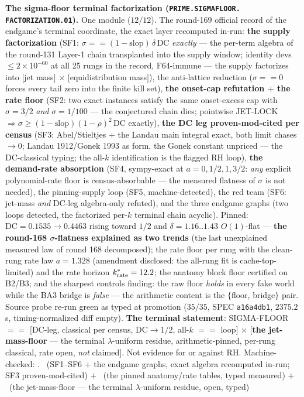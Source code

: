 \par\smallskip\noindent\textbf{The sigma-floor terminal
factorization (\texttt{PRIME.\allowbreak SIGMAFLOOR.\allowbreak
FACTORIZATION.01}).}
One module ($12/12$).  The round-169 official record of the
endgame's terminal coordinate, the exact layer recomputed
in-run: \textbf{the supply factorization} (SF1: $\sigma == (1 -
\mathrm{slop})\,\delta\,\mathrm{DC}$ \emph{exactly} --- the
per-term algebra of the round-131 Layer-1 chain transplanted
into the supply window; identity devs $\le 2\times10^{-60}$ at
all 25 rungs in the record, F64-immune --- the supply
factorizes into $[$jet mass$]$ $\times$ $[$equidistribution
mass$]$), the anti-lattice reduction ($\sigma == 0$ forces every
tail zero into the finite kill set), \textbf{the onset-cap
refutation $+$ the rate floor} (SF2: two exact instances
satisfy the same onset-excess cap with $\sigma = 3/2$ \emph{and}
$\sigma = 1/100$ --- the conjectured chain dies; pointwise
JET-LOCK $\Rightarrow \sigma \ge (1 - \mathrm{slop})(1 -
\rho)^2\,\mathrm{DC}$ exactly), \textbf{the DC leg
proven-mod-cited per census} (SF3: Abel/Stieltjes $+$ the Landau
main integral exact, both limit chases $\to 0$; Landau
1912/Gonek 1993 as form, the Gonek constant unpriced --- the
DC-classical typing; the all-$k$ identification is the flagged
RH loop), \textbf{the demand-rate absorption} (SF4, sympy-exact
at $a = 0, 1/2, 1, 3/2$: \emph{any} explicit polynomial-rate
floor is census-absorbable --- the measured flatness of
$\sigma$ is not needed), the pinning-supply loop (SF5,
machine-detected), the red team (SF6: jet-mass \emph{and}
DC-leg algebra-only refuted), and the three endgame graphs (two
loops detected, the factorized per-$k$ terminal chain acyclic).
Pinned: $\mathrm{DC} = 0.1535 \to 0.4463$ rising toward $1/2$
and $\delta = 1.16..1.43$ $O(1)$-flat --- \textbf{the round-168
$\sigma$-flatness explained as two trends} (the last unexplained
measured law of round 168 decomposed); the rate floor per rung
with the clean-rung rate law $a = 1.328$ (amendment disclosed:
the all-rung fit is cache-top-limited) and the rate horizon
$k^*_{\rm rate} = 12.2$; the anatomy block floor certified on
B2/B3; and the sharpest controls finding: the raw floor
\emph{holds} in every fake world while the BA3 bridge is
\emph{false} --- the arithmetic content is the $\{$floor,
bridge$\}$ pair.  Source probe re-run green as typed at
promotion ($35/35$, SPEC \texttt{a16a4db1}, $2375.2$ s,
timing-normalized diff empty).  \textbf{The terminal statement}:
SIGMA-FLOOR $==$ $[$DC-leg, classical per census, $\mathrm{DC}
\to 1/2$, all-$k$ $==$ loop$]$ $\times$ $[$\textbf{the
jet-mass-floor} --- the terminal $\lambda$-uniform residue,
arithmetic-pinned, per-rung classical, rate open, \emph{not}
claimed$]$.  Not evidence for or against RH.
Machine-checked: .
\mE\ (SF1--SF6 $+$ the endgame graphs, exact algebra recomputed
in-run; SF3 proven-mod-cited) $+$ \mC\ (the pinned anatomy/rate
tables, typed measured) $+$ \mO\ (the jet-mass-floor --- the
terminal $\lambda$-uniform residue, open, typed)
\par\smallskip


